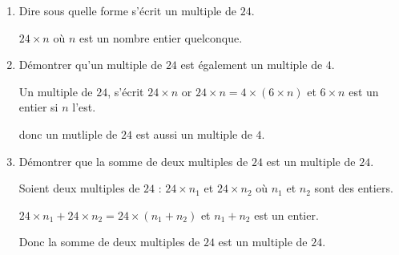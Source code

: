     \begin{enumerate}
        \item Dire sous quelle forme s'écrit un multiple de $24$.

        $24\times n$ où $n$ est un nombre entier quelconque.
        \item Démontrer qu'un multiple de $24$ est également un multiple de $4$.

        Un multiple de $24$, s'écrit $24\times n$ or $24\times n = 4\times (6\times n)$ et $6\times n$ est un entier si $n$ l'est.

        donc un mutliple de $24$ est aussi un multiple de $4$.
        \item Démontrer que la somme de deux multiples de $24$ est un multiple de $24$.

        Soient deux multiples de $24$ : $24\times n_1$ et $24\times n_2$ où $n_1$ et $n_2$ sont des entiers.

        $24\times n_1+24\times n_2 = 24\times (n_1+n_2)$ et $n_1+n_2$ est un entier.

        Donc la somme de deux multiples de $24$ est un multiple de $24$.
    \end{enumerate}
